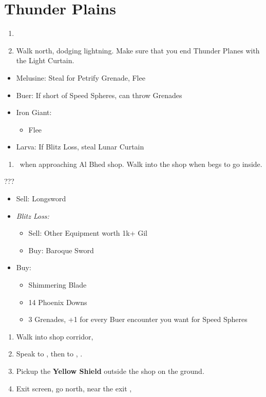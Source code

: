 \chapter{Thunder Plains}

\begin{enumerate}
	\item \formation{\tidus}{\rikku}{\auron}
	\item Walk north, dodging lightning. Make sure that you end Thunder Planes with the Light Curtain.
\end{enumerate}
\begin{encounters}
\begin{itemize}
	\item Melusine: Steal for Petrify Grenade, Flee
	\item Buer: If short of Speed Spheres, can throw Grenades
	\item Iron Giant:
	\begin{itemize}
		\yunaf Attack to build \od
		\rikkuf Steal Light Curtain
		\item Flee
	\end{itemize}
	\item Larva: If Blitz Loss, steal Lunar Curtain
\end{itemize}
\end{encounters}
\begin{enumerate}[resume]
	\item \sd\ when approaching Al Bhed shop. Walk into the shop when \rikku begs to go inside.
\end{enumerate}
\begin{shop}{???}
\begin{itemize}
	\item Sell: Longsword
	\item \textit{Blitz Loss:}
	\begin{itemize}
		\item Sell: Other Equipment worth 1k+ Gil
		\item Buy: Baroque Sword
	\end{itemize}
	\item Buy:
	\begin{itemize}
		\item Shimmering Blade
		\item 14 Phoenix Downs
		\item 3 Grenades, +1 for every Buer encounter you want for Speed Spheres
	\end{itemize}
\end{itemize}
\end{shop}
\begin{enumerate}[resume]
	\item Walk into shop corridor, \cs[2:00]
	\item Speak to \auron, then to \rikku, \sd.
	\item Pickup the \textbf{Yellow Shield} outside the shop on the ground.
	\item Exit screen, go north, near the exit \sd, \cs[3:10]
\end{enumerate}